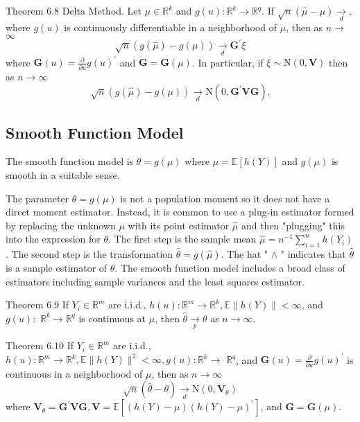 \documentclass[10pt]{article}
\begin{document}
Theorem 6.8 Delta Method. Let $\mu \in \mathbb{R}^{k}$ and $g(u): \mathbb{R}^{k} \rightarrow \mathbb{R}^{q}$. If $\sqrt{n}(\widehat{\mu}-\mu) \underset{d}{\rightarrow}$, where $g(u)$ is continuously differentiable in a neighborhood of $\mu$, then as $n \rightarrow$ $\infty$
$$
\sqrt{n}(g(\widehat{\mu})-g(\mu)) \underset{d}{\longrightarrow} \boldsymbol{G}^{\prime} \xi
$$
where $\boldsymbol{G}(u)=\frac{\partial}{\partial u} g(u)^{\prime}$ and $\boldsymbol{G}=\boldsymbol{G}(\mu)$. In particular, if $\xi \sim \mathrm{N}(0, \boldsymbol{V})$ then as $n \rightarrow \infty$
$$
\sqrt{n}(g(\widehat{\mu})-g(\mu)) \underset{d}{\longrightarrow} \mathrm{N}\left(0, \boldsymbol{G}^{\prime} \boldsymbol{V} \boldsymbol{G}\right) .
$$

\subsection{Smooth Function Model}
The smooth function model is $\theta=g(\mu)$ where $\mu=\mathbb{E}[h(Y)]$ and $g(\mu)$ is smooth in a suitable sense.

The parameter $\theta=g(\mu)$ is not a population moment so it does not have a direct moment estimator. Instead, it is common to use a plug-in estimator formed by replacing the unknown $\mu$ with its point estimator $\widehat{\mu}$ and then "plugging" this into the expression for $\theta$. The first step is the sample mean $\widehat{\mu}=n^{-1} \sum_{i=1}^{n} h\left(Y_{i}\right)$. The second step is the transformation $\widehat{\theta}=g(\widehat{\mu})$. The hat " $\wedge$ " indicates that $\widehat{\theta}$ is a sample estimator of $\theta$. The smooth function model includes a broad class of estimators including sample variances and the least squares estimator.

Theorem 6.9 If $Y_{i} \in \mathbb{R}^{m}$ are i.i.d., $h(u): \mathbb{R}^{m} \rightarrow \mathbb{R}^{k}, \mathbb{E}\|h(Y)\|<\infty$, and $g(u):$ $\mathbb{R}^{k} \rightarrow \mathbb{R}^{q}$ is continuous at $\mu$, then $\widehat{\theta} \underset{p}{\longrightarrow} \theta$ as $n \rightarrow \infty$.

Theorem 6.10 If $Y_{i} \in \mathbb{R}^{m}$ are i.i.d., $h(u): \mathbb{R}^{m} \rightarrow \mathbb{R}^{k}, \mathbb{E}\|h(Y)\|^{2}<\infty, g(u): \mathbb{R}^{k} \rightarrow$ $\mathbb{R}^{q}$, and $\boldsymbol{G}(u)=\frac{\partial}{\partial u} g(u)^{\prime}$ is continuous in a neighborhood of $\mu$, then as $n \rightarrow \infty$
$$
\sqrt{n}(\widehat{\theta}-\theta) \underset{d}{\longrightarrow} \mathrm{N}\left(0, \boldsymbol{V}_{\theta}\right)
$$
where $\boldsymbol{V}_{\theta}=\boldsymbol{G}^{\prime} \boldsymbol{V} \boldsymbol{G}, \boldsymbol{V}=\mathbb{E}\left[(h(Y)-\mu)(h(Y)-\mu)^{\prime}\right]$, and $\boldsymbol{G}=\boldsymbol{G}(\mu)$.
\end{document}
